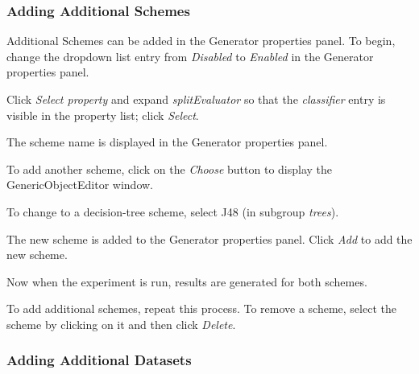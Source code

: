 \documentclass[a4paper]{article}
\begin{document}
\subsubsection*{Adding Additional Schemes}

Additional Schemes can be added in the Generator properties panel. To begin, change the dropdown list entry from \textit{Disabled} to \textit{Enabled} in the Generator properties panel.
\begin{center}
\end{center}

Click \textit{Select property} and expand \textit{splitEvaluator} so that the \textit{classifier} entry is visible in the property list; click \textit{Select}.
\begin{center}
\end{center}

The scheme name is displayed in the Generator properties panel.
\begin{center}
\end{center}

To add another scheme, click on the \textit{Choose} button to display the GenericObjectEditor window.
\begin{center}
\end{center}

To change to a decision-tree scheme, select J48 (in subgroup \textit{trees}).
\begin{center}
\end{center}

The new scheme is added to the Generator properties panel. Click \textit{Add} to add the new scheme.
\begin{center}
\end{center}

Now when the experiment is run, results are generated for both schemes.

To add additional schemes, repeat this process. To remove a scheme, select the scheme by clicking on it and then click \textit{Delete}.


\subsubsection*{Adding Additional Datasets}
\end{document}
